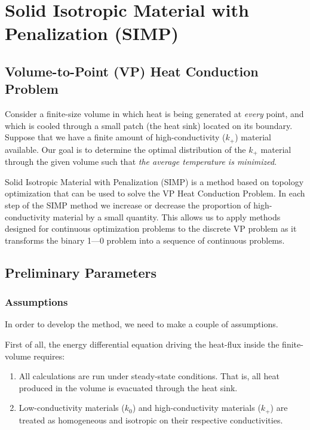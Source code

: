 \section{Solid Isotropic Material with Penalization (SIMP)}

\subsection*{Volume-to-Point (VP) Heat Conduction Problem}

Consider a finite-size volume in which heat is being generated at \textit{every} point, and which is cooled through a small patch (the heat sink) located on its boundary. Suppose that we have a finite amount of high-conductivity ($k_+$) material available. Our goal is to determine the optimal distribution of the $k_+$ material through the given volume such that \textit{the average temperature is minimized}.

Solid Isotropic Material with Penalization (SIMP) is a method based on topology optimization that can be used to solve the VP Heat Conduction Problem. In each step of the SIMP method we increase or decrease the proportion of high-conductivity material by a small quantity. This allows us to apply methods designed for continuous optimization problems to the discrete VP problem as it transforms the binary 1---0 problem into a sequence of continuous problems.

\subsection{Preliminary Parameters}

\subsubsection*{Assumptions}
In order to develop the method, we need to make a couple of assumptions.

First of all, the energy differential equation driving the heat-flux inside the finite-volume requires:
\begin{enumerate}
	\item All calculations are run under steady-state conditions. That is, all heat produced in the volume is evacuated through the heat sink.
	\item Low-conductivity materials ($k_0$) and high-conductivity materials ($k_+$) are treated as homogeneous and isotropic on their respective conductivities.
\end{enumerate}


